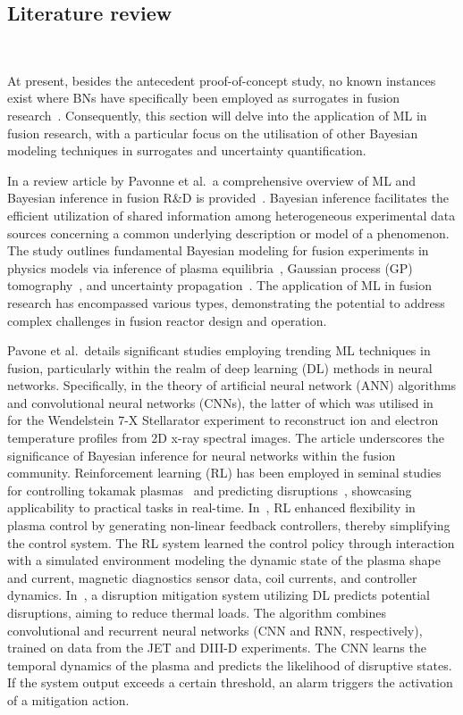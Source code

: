 \documentclass[journal]{IEEEtran}
\begin{document}
\subsection{Literature review}~\label{sec:background}

At present, besides the antecedent proof-of-concept study, no known instances exist where BNs have specifically been employed as surrogates in fusion research~\cite{Griffiths2024}. Consequently, this section will delve into the application of ML in fusion research, with a particular focus on the utilisation of other Bayesian modeling techniques in surrogates and uncertainty quantification.

In a review article by Pavonne et al.\ a comprehensive overview of ML and Bayesian inference in fusion R\&D is provided~\cite{Pavone2023}. Bayesian inference facilitates the efficient utilization of shared information among heterogeneous experimental data sources concerning a common underlying description or model of a phenomenon. The study outlines fundamental Bayesian modeling for fusion experiments in physics models via inference of plasma equilibria~\cite{Svensson2003, Svensson2004}, Gaussian process (GP) tomography~\cite{Svensson2011}, and uncertainty propagation~\cite{Fischer2020, Fischer2010}. The application of ML in fusion research has encompassed various types, demonstrating the potential to address complex challenges in fusion reactor design and operation.

Pavone et al.~details significant studies employing trending ML techniques in fusion, particularly within the realm of deep learning (DL) methods in neural networks. Specifically, in the theory of artificial neural network (ANN) algorithms and convolutional neural networks (CNNs), the latter of which was utilised in~\cite{Pavone2019} for the Wendelstein 7-X Stellarator experiment to reconstruct ion and electron temperature profiles from 2D x-ray spectral images. The article underscores the significance of Bayesian inference for neural networks within the fusion community. Reinforcement learning (RL) has been employed in seminal studies for controlling tokamak plasmas~\cite{Degrave2022} and predicting disruptions~\cite{Kates2019}, showcasing applicability to practical tasks in real-time. In~\cite{Degrave2022}, RL enhanced flexibility in plasma control by generating non-linear feedback controllers, thereby simplifying the control system. The RL system learned the control policy through interaction with a simulated environment modeling the dynamic state of the plasma shape and current, magnetic diagnostics sensor data, coil currents, and controller dynamics. In~\cite{Kates2019}, a disruption mitigation system utilizing DL predicts potential disruptions, aiming to reduce thermal loads. The algorithm combines convolutional and recurrent neural networks (CNN and RNN, respectively), trained on data from the JET and DIII-D experiments. The CNN learns the temporal dynamics of the plasma and predicts the likelihood of disruptive states. If the system output exceeds a certain threshold, an alarm triggers the activation of a mitigation action. 
\end{document}
